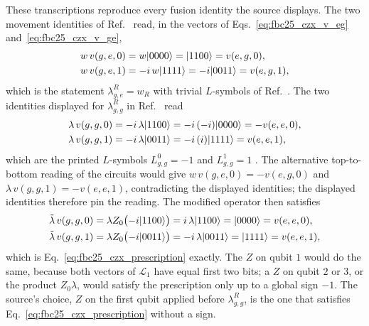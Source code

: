 \documentclass{article}
\begin{document}
These transcriptions reproduce every fusion identity the source displays.
The two movement identities of
Ref.~\cite[lines~4889--4988]{FrancoRubio2025MPUGauging} read, in the
vectors of Eqs.~\ref{eq:fbc25_czx_v_eg} and~\ref{eq:fbc25_czx_v_ge},
\begin{align}
    w\,v(g,e,0)
        &=w|0000\rangle=|1100\rangle=v(e,g,0),
    \label{eq:fbc25_czx_w_identity_0}\\
    w\,v(g,e,1)
        &=-i\,w|1111\rangle=-i|0011\rangle=v(e,g,1),
    \label{eq:fbc25_czx_w_identity_1}
\end{align}
which is the statement $\lambda^R_{g,e}=w_R$ with trivial $L$-symbols
 of
Ref.~\cite[lines~3331--3340]{FrancoRubio2025MPUGauging}. The two identities
displayed for $\lambda^R_{g,g}$ in
Ref.~\cite[lines~5014--5066]{FrancoRubio2025MPUGauging} read
\begin{align}
    \lambda\,v(g,g,0)
        &=-i\,\lambda|1100\rangle=-i\,(-i)|0000\rangle=-v(e,e,0),
    \label{eq:fbc25_czx_lambda_identity_0}\\
    \lambda\,v(g,g,1)
        &=-i\,\lambda|0011\rangle=-i\,(i)|1111\rangle=v(e,e,1),
    \label{eq:fbc25_czx_lambda_identity_1}
\end{align}
which are the printed $L$-symbols $L^0_{g,g}=-1$ and $L^1_{g,g}=1$
\cite[line~5067]{FrancoRubio2025MPUGauging}. The alternative top-to-bottom
reading of the circuits would give $w\,v(g,e,0)=-v(e,g,0)$ and
$\lambda\,v(g,g,1)=-v(e,e,1)$, contradicting the displayed identities; the
displayed identities therefore pin the reading. The modified operator then
satisfies
\begin{align}
    \tilde\lambda\,v(g,g,0)
        &=\lambda Z_0\bigl(-i|1100\rangle\bigr)
        =i\,\lambda|1100\rangle
        =|0000\rangle=v(e,e,0),
    \label{eq:fbc25_czx_tilde_identity_0}\\
    \tilde\lambda\,v(g,g,1)
        &=\lambda Z_0\bigl(-i|0011\rangle\bigr)
        =-i\,\lambda|0011\rangle
        =|1111\rangle=v(e,e,1),
    \label{eq:fbc25_czx_tilde_identity_1}
\end{align}
which is Eq.~\ref{eq:fbc25_czx_prescription} exactly. The $Z$ on qubit $1$
would do the same, because both vectors of $\mathcal L_1$ have equal first
two bits; a $Z$ on qubit $2$ or $3$, or the product $Z_0\lambda$, would
satisfy the prescription only up to a global sign $-1$. The source's
choice, $Z$ on the first qubit applied before $\lambda^R_{g,g}$, is the one
that satisfies Eq.~\ref{eq:fbc25_czx_prescription} without a sign.
\end{document}

